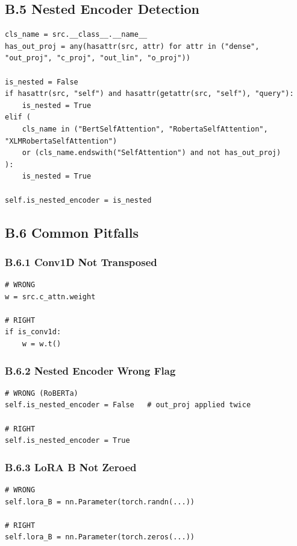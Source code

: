\subsection{B.5 Nested Encoder Detection}

\begin{lstlisting}
cls_name = src.__class__.__name__
has_out_proj = any(hasattr(src, attr) for attr in ("dense", "out_proj", "c_proj", "out_lin", "o_proj"))

is_nested = False
if hasattr(src, "self") and hasattr(getattr(src, "self"), "query"):
    is_nested = True
elif (
    cls_name in ("BertSelfAttention", "RobertaSelfAttention", "XLMRobertaSelfAttention")
    or (cls_name.endswith("SelfAttention") and not has_out_proj)
):
    is_nested = True

self.is_nested_encoder = is_nested
\end{lstlisting}

\subsection{B.6 Common Pitfalls}

\subsubsection{B.6.1 Conv1D Not Transposed}

\begin{lstlisting}
# WRONG
w = src.c_attn.weight

# RIGHT
if is_conv1d:
    w = w.t()
\end{lstlisting}

\subsubsection{B.6.2 Nested Encoder Wrong Flag}

\begin{lstlisting}
# WRONG (RoBERTa)
self.is_nested_encoder = False   # out_proj applied twice

# RIGHT
self.is_nested_encoder = True
\end{lstlisting}

\subsubsection{B.6.3 LoRA B Not Zeroed}

\begin{lstlisting}
# WRONG
self.lora_B = nn.Parameter(torch.randn(...))

# RIGHT
self.lora_B = nn.Parameter(torch.zeros(...))
\end{lstlisting}

